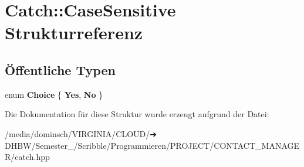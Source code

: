 \hypertarget{structCatch_1_1CaseSensitive}{}\section{Catch\+:\+:Case\+Sensitive Strukturreferenz}
\label{structCatch_1_1CaseSensitive}
\subsection*{Öffentliche Typen}
\begin{DoxyCompactItemize}
\item 
\mbox{\label{structCatch_1_1CaseSensitive_aad49d3aee2d97066642fffa919685c6a}} 
enum {\bfseries Choice} \{ {\bfseries Yes}, 
{\bfseries No}
 \}
\end{DoxyCompactItemize}


Die Dokumentation für diese Struktur wurde erzeugt aufgrund der Datei\+:\begin{DoxyCompactItemize}
\item 
/media/dominsch/\+V\+I\+R\+G\+I\+N\+I\+A/\+C\+L\+O\+U\+D/➔ D\+H\+B\+W/\+Semester\+\_/\+Scribble/\+Programmieren/\+P\+R\+O\+J\+E\+C\+T/\+C\+O\+N\+T\+A\+C\+T\+\_\+\+M\+A\+N\+A\+G\+E\+R/catch.\+hpp\end{DoxyCompactItemize}
